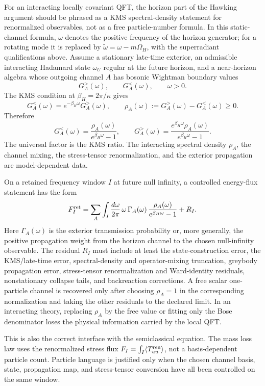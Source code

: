 \begin{controlledapproximation}
\label{ca:hawking-interacting-horizon-flux-package}
For an interacting locally covariant QFT, the horizon part of the Hawking
argument should be phrased as a KMS spectral-density statement for renormalized
observables, not as a free particle-number formula.  In this static-channel
formula, \(\omega\) denotes the positive frequency of the horizon generator;
for a rotating mode it is replaced by
\(\widetilde\omega=\omega-m\Omega_H\), with the superradiant qualifications
above.  Assume a stationary late-time exterior, an admissible interacting
Hadamard state \(\omega_U\) regular at the future horizon, and a near-horizon
algebra whose outgoing channel \(A\) has bosonic Wightman boundary values
\[
  G_A^>(\omega),\qquad G_A^<(\omega),
  \qquad \omega>0 .
\]
The KMS condition at \(\beta_H=2\pi/\kappa\) gives
\[
  G_A^<(\omega)=e^{-\beta_H\omega}G_A^>(\omega),
  \qquad
  \rho_A(\omega):=G_A^>(\omega)-G_A^<(\omega)\ge0.
\]
Therefore
\begin{equation}
  G_A^<(\omega)=
  \frac{\rho_A(\omega)}{e^{\beta_H\omega}-1},
  \qquad
  G_A^>(\omega)=
  \frac{e^{\beta_H\omega}\rho_A(\omega)}
       {e^{\beta_H\omega}-1}.
  \label{eq:hawking-interacting-kms-spectral-density}
\end{equation}
The universal factor is the KMS ratio.  The interacting spectral density
\(\rho_A\), the channel mixing, the stress-tensor renormalization, and the
exterior propagation are model-dependent data.

On a retained frequency window \(I\) at future null infinity, a controlled
energy-flux statement has the form
\begin{equation}
  F_I^{\rm ret}
  =
  \sum_A
  \int_I\frac{d\omega}{2\pi}\,
  \omega\,\Gamma_A(\omega)\,
  \frac{\rho_A(\omega)}{e^{\beta_H\omega}-1}
  +
  R_I .
  \label{eq:hawking-interacting-retained-flux}
\end{equation}
Here \(\Gamma_A(\omega)\) is the exterior transmission probability or, more
generally, the positive propagation weight from the horizon channel to the
chosen null-infinity observable.  The residual \(R_I\) must include at least
the state-construction error, the KMS/late-time error, spectral-density and
operator-mixing truncation, greybody propagation error, stress-tensor
renormalization and Ward-identity residuals, nonstationary collapse tails, and
backreaction corrections.  A free scalar one-particle channel is recovered only
after choosing \(\rho_A=1\) in the corresponding normalization and taking the
other residuals to the declared limit.  In an interacting theory, replacing
\(\rho_A\) by the free value or fitting only the Bose denominator loses the
physical information carried by the local QFT.

This is also the correct interface with the semiclassical equation.  The mass
loss law uses the renormalized stress flux
\(F_I=\int_I\langle T_{uu}^{\rm ren}\rangle\), not a basis-dependent particle
count.  Particle language is justified only when the chosen channel basis,
state, propagation map, and stress-tensor conversion have all been controlled
on the same window.
\end{controlledapproximation}

